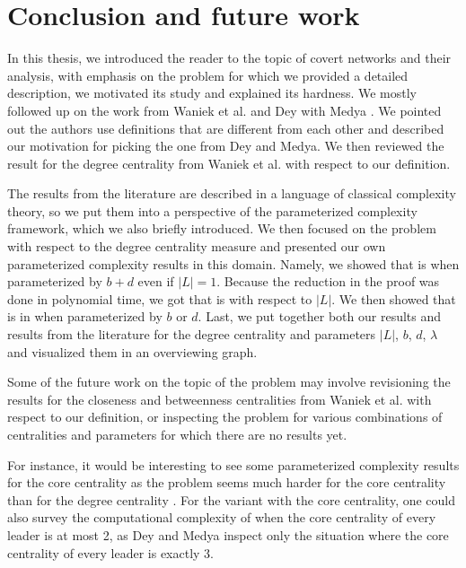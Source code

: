 \chapter{Conclusion and future work}

In this thesis, we introduced the reader to the topic of covert networks and their analysis,
with emphasis on the \HL problem for which we provided a detailed description, we motivated its study
and explained its hardness.
We mostly followed up on the work from Waniek et al. and Dey with Medya \cite{Waniek2017,Dey2019}.
We pointed out the authors use definitions that are different from each other and described our motivation
for picking the one from Dey and Medya.
We then reviewed the result for the degree centrality from Waniek et al. with respect to our definition.

The results from the literature are described in a language of classical complexity theory,
so we put them into a perspective of the parameterized complexity framework, which we also briefly introduced.
We then focused on the problem with respect to the degree centrality measure
and presented our own parameterized complexity results in this domain.
Namely, we showed that \HL is \Wh when parameterized by $b+d$ even if $|L| = 1$.
Because the reduction in the proof was done in polynomial time,
we got that \HLshort is \pNPh with respect to $|L|$.
We then showed that \HLshort is in \XP when parameterized by $b$ or $d$.
Last, we put together both our results and results from the literature for the degree centrality
and parameters $|L|$, $b$, $d$, $\lambda$ and visualized them in an overviewing graph.

Some of the future work on the topic of the \HL problem may involve
revisioning the results for the closeness and betweenness centralities from Waniek et al. \cite{Waniek2021full}
with respect to our definition,
or inspecting the problem for various combinations of centralities and parameters for which there are no results yet.

For instance, it would be interesting to see some parameterized complexity results for the core centrality
as the problem seems much harder for the core centrality than for the degree centrality \cite{Dey2019}.
For the variant with the core centrality, one could also survey the computational complexity of \HLshort
when the core centrality of every leader is at most 2,
as Dey and Medya \cite{Dey2019} inspect only the situation where the core centrality of every leader is exactly 3.

